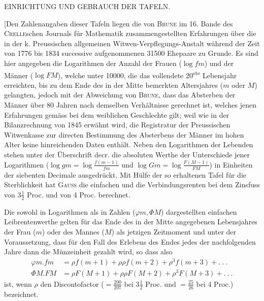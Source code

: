 \clearpage
{}
\begin{center}EINRICHTUNG UND GEBRAUCH DER TAFELN.\end{center}
\noindent\hspace*{1.2em} [Den Zahlenangaben dieser Tafeln liegen die von \textsc{Brune} im 16. Bande des \textsc{Crelle}schen Journals für Mathematik zusammengestellten Erfahrungen über die in der k. Preussischen allgemeinen Witwen-Verpflegungs-Anstalt während der Zeit von 1776 bis 1834 successive aufgenommenen 31500 Ehepaare zu Grunde. Es sind hier angegeben die Logarithmen der Anzahl der Frauen (\(\log fm\)) und der Männer (\(\log FM\)), welche unter 10000, die das vollendete 20\textsuperscript{ste} Lebensjahr erreichten, bis zu dem Ende des in der Mitte bemerkten Altersjahres (\(m\) oder \(M\)) gelangten, jedoch mit der Abweichung von \textsc{Brune}, dass das Absterben der Männer über 80 Jahren nach demselben Verhältnisse gerechnet ist, welches jenen Erfahrungen gemäss bei dem weiblichen Geschlechte gilt; weil wie in der Bilanzrechnung von 1845 erwähnt wird, die Registratur der Preussischen Witwenkasse zur directen Bestimmung des Absterbens der Männer im hohen Alter keine hinreichenden Daten enthält. Neben den Logarithmen der Lebenden stehen unter der Überschrift decr. die absoluten Werthe der Unterschiede jener Logarithmen (\(\log gm=\log\frac{f(m-1)}{fm}\) und \(\log Gm=\log\frac{F(M-1)}{FM}\)) in Einheiten der siebenten Decimale ausgedrückt. Mit Hülfe der so erhaltenen Tafel für die Sterblichkeit hat \textsc{Gauss} die einfachen und die Verbindungsrenten bei dem Zinsfuss von \(3\tfrac{1}{2}\) Proc. und von 4 Proc. berechnet.

Die sowohl in Logarithmen als in Zahlen (\(\varphi m,\Phi M\)) dargestellten einfachen Leibrentenwerthe gelten für das Ende des in der Mitte angegebenen Lebensjahres der Frau (\(m\)) oder des Mannes (\(M\)) als jetzigen Zeitmoment und unter der Voraussetzung, dass für den Fall des Erlebens des Endes jedes der nachfolgenden Jahre dann die Münzeinheit gezahlt wird, so dass also
\[
\begin{aligned}
\varphi m\mathord{.}fm&=\rho f(m+1)+\rho\rho f(m+2)+\rho^3f(m+3)+.\ .\ .\\
\Phi M\mathord{.}FM&=\rho F(M+1)+\rho\rho F(M+2)+\rho^3F(M+3)+.\ .\ .
\end{aligned}
\]
ist, wenn \(\rho\) den Discontofactor (\(=\tfrac{200}{207}\) bei \(3\tfrac{1}{2}\) Proc. und \(=\tfrac{25}{26}\) bei 4 Proc.) bezeichnet.

